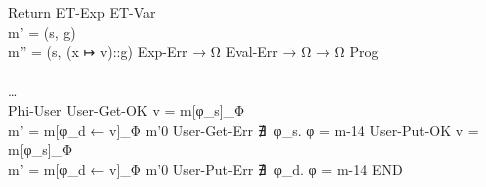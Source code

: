 {{               { }
               { 
               }
    }
    {Return}{ 
              { }
              {  }
    }
    {ET-Exp}{ 
                {}
                {}
            }
    {ET-Var}{ 
                {
               \\ m'  = (s, g)
               \\ m'' = (s, (x ↦ v)::g)
                }
                {}
    }
    {Exp-Err}{ 
                 { }
                 {  → Ω }
    }
    {Eval-Err}{ 
                  {  → Ω }
                  {  → Ω }
    }
    {Prog}{ 
              { 
             \\ 
             \\ …
             \\ 
              }
              {}
    }
    {Phi-User}{ 
                      { }
                      {  }
    }
    {User-Get-OK}{ 
                     { v  = m[φ_s]_Φ
                    \\ m' = m[φ_d ← v]_Φ
                     }
                     { 
                       {m'}{0}
                     }
    }
    {User-Get-Err}{ 
                      {
                        ∄~φ_s. φ = 
                      }
                      { 
                           {m}{-14}
                      }
    }
    {User-Put-OK}{ 
                     { v = m[φ_s]_Φ
                    \\ m' = m[φ_d ← v]_Φ
                     }
                     { 
                         {m'}{0}
                     }
    }
    {User-Put-Err}{ 
                      {
                        ∄~φ_d. φ = 
                      }
                      { 
                           {m}{-14}
                      }
    }
    {END}
}

\def\figctx{
  \begin{align*}
  \gramdef{Contextes}{C}
    { \ctxEmpty }{}
    { \ctxOp{C}{e} }{}
    { \ctxOp{v}{C} }{}
    { \ctxUnOp{C} }{}
    { \&~C }{}
    { \ctxSet{C}{e} }{}
    { \ctxSet{φ}{C} }{}
    { \eStruct{ l_1:v_1 ; … ; l_i:C ; … ; l_n:e_n } }{}
    { \eArray{ v_1 ; … ; C ; … ; e_n } }{}
    { C (e_1, …, e_n) }{}
    { f (v_1, …, C, …, e_n) }{}
    { \ctxLvField{C}{l_S} }{}
    { \ctxLvIndex{C}{e} }{}
    { \ctxLvIndex{φ}{C} }{}
    { *~C }{}
    { C;i }{}
    { \iIf{C}{i_1}{i_2} }{}
    { \iReturn{C} }{}
    { \iDecl{x}{C}{i} }{}
    {END}
  \end{align*}
}

